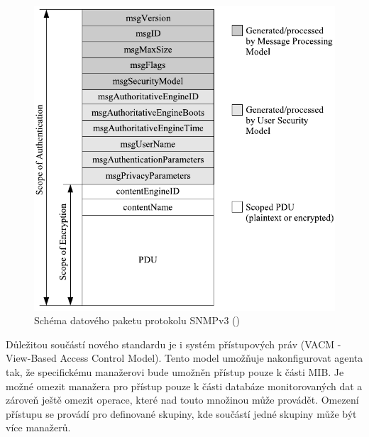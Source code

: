 \begin{figure}[htp]
	\begin{center}
		\includegraphics{obrazky/02_snmpv3_pdu.pdf}
		\caption{Schéma datového paketu protokolu SNMPv3 (\cite{macejko_dipl})}
		\label{obr_snmp4}
	\end{center}
\end{figure}


Důležitou součástí nového standardu je i systém přístupových práv (VACM - View-Based Access Control Model). Tento model umožňuje nakonfigurovat agenta tak, 
že specifickému manažerovi bude umožněn přístup pouze k části MIB. Je možné omezit manažera pro přístup pouze k části databáze monitorovaných dat a 
zároveň ještě omezit operace, které nad touto množinou může provádět. Omezení přístupu se provádí pro definované skupiny, kde součástí jedné skupiny může být
více manažerů.

